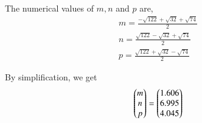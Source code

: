 \documentclass[journal,12pt,twocolumn]{IEEEtran}
\theoremstyle{remark}
\begin{document}
\vspace{0.3cm}
The numerical values of $m,n$ and $p$ are,
\begin{align}
m = \frac{-\sqrt{122}+\sqrt{32}+\sqrt{74}}{2}\\
n = \frac{\sqrt{122}-\sqrt{32}+\sqrt{74}}{2}\\
p = \frac{\sqrt{122}+\sqrt{32}-\sqrt{74}}{2}
\end{align}

\vspace{0.3cm}
By simplification, we get
\begin{align}
\begin{pmatrix}m\\n\\p\end{pmatrix} = \begin{pmatrix}1.606\\6.995\\4.045\end{pmatrix}
\end{align}







\newpage


\bigskip

\renewcommand{\thefigure}{\theenumi}
\renewcommand{\thetable}{\theenumi}

%




%
\end{document}
